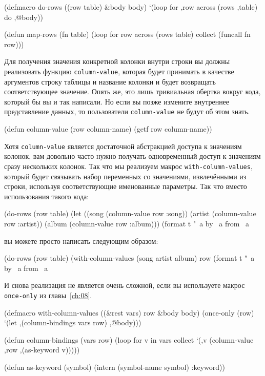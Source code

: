 \begin{myverb}
(defmacro do-rows ((row table) &body body)
  `(loop for ,row across (rows ,table) do ,@body))

(defun map-rows (fn table)
  (loop for row across (rows table) collect (funcall fn row)))
\end{myverb}

Для получения значения конкретной колонки внутри строки вы должны реализовать функцию
\lstinline{column-value}, которая будет принимать в качестве аргументов строку таблицы и
название колонки и будет возвращать соответствующее значение.  Опять же, это лишь
тривиальная обертка вокруг кода, который бы вы и так написали.  Но если вы позже измените
внутреннее представление данных, то пользователи \lstinline{column-value} не будут об этом
знать.

\begin{myverb}
(defun column-value (row column-name)
  (getf row column-name))
\end{myverb}

Хотя \lstinline{column-value} является достаточной абстракцией доступа к значениям колонок, вам
довольно часто нужно получать одновременный доступ к значениям сразу нескольких колонок.
Так что мы реализуем макрос \lstinline{with-column-values}, который будет связывать набор
переменных со значениями, извлечёнными из строки, используя соответствующие именованные
параметры.  Так что вместо использования такого кода:

\begin{myverb}
 (do-rows (row table)
   (let ((song (column-value row :song))
         (artist (column-value row :artist))
         (album (column-value row :album)))
     (format t "~a by ~a from ~a~%
\end{myverb}

\noindent{}вы можете просто написать следующим образом:

\begin{myverb}
(do-rows (row table)
  (with-column-values (song artist album) row
    (format t "~a by ~a from ~a~%
\end{myverb}

И снова реализация не является очень сложной, если вы используете макрос \lstinline{once-only}
из главы~\ref{ch:08}.

\begin{myverb}
(defmacro with-column-values ((&rest vars) row &body body)
  (once-only (row)
    `(let ,(column-bindings vars row) ,@body)))

(defun column-bindings (vars row)
  (loop for v in vars collect `(,v (column-value ,row ,(as-keyword v)))))

(defun as-keyword (symbol)
  (intern (symbol-name symbol) :keyword))
\end{myverb}

